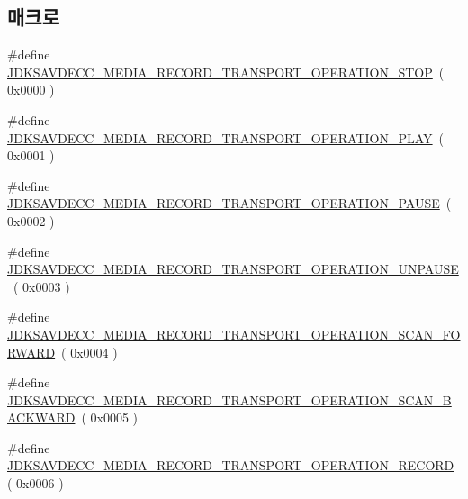 \subsection*{매크로}
\begin{DoxyCompactItemize}
\item 
\#define \hyperlink{group__media__record__transport__operation_ga816ace61621d154aa7f01a2a7f62cb23}{J\+D\+K\+S\+A\+V\+D\+E\+C\+C\+\_\+\+M\+E\+D\+I\+A\+\_\+\+R\+E\+C\+O\+R\+D\+\_\+\+T\+R\+A\+N\+S\+P\+O\+R\+T\+\_\+\+O\+P\+E\+R\+A\+T\+I\+O\+N\+\_\+\+S\+T\+OP}~( 0x0000 )
\item 
\#define \hyperlink{group__media__record__transport__operation_ga28f803d66f4e81eb4666a5a24b9708a4}{J\+D\+K\+S\+A\+V\+D\+E\+C\+C\+\_\+\+M\+E\+D\+I\+A\+\_\+\+R\+E\+C\+O\+R\+D\+\_\+\+T\+R\+A\+N\+S\+P\+O\+R\+T\+\_\+\+O\+P\+E\+R\+A\+T\+I\+O\+N\+\_\+\+P\+L\+AY}~( 0x0001 )
\item 
\#define \hyperlink{group__media__record__transport__operation_ga2d954b7946568252bf65d56d92bd7aec}{J\+D\+K\+S\+A\+V\+D\+E\+C\+C\+\_\+\+M\+E\+D\+I\+A\+\_\+\+R\+E\+C\+O\+R\+D\+\_\+\+T\+R\+A\+N\+S\+P\+O\+R\+T\+\_\+\+O\+P\+E\+R\+A\+T\+I\+O\+N\+\_\+\+P\+A\+U\+SE}~( 0x0002 )
\item 
\#define \hyperlink{group__media__record__transport__operation_ga5ce65b2eec525136ecdba4d766371b5e}{J\+D\+K\+S\+A\+V\+D\+E\+C\+C\+\_\+\+M\+E\+D\+I\+A\+\_\+\+R\+E\+C\+O\+R\+D\+\_\+\+T\+R\+A\+N\+S\+P\+O\+R\+T\+\_\+\+O\+P\+E\+R\+A\+T\+I\+O\+N\+\_\+\+U\+N\+P\+A\+U\+SE}~( 0x0003 )
\item 
\#define \hyperlink{group__media__record__transport__operation_gac1908031b1369009b8a76192fbcad065}{J\+D\+K\+S\+A\+V\+D\+E\+C\+C\+\_\+\+M\+E\+D\+I\+A\+\_\+\+R\+E\+C\+O\+R\+D\+\_\+\+T\+R\+A\+N\+S\+P\+O\+R\+T\+\_\+\+O\+P\+E\+R\+A\+T\+I\+O\+N\+\_\+\+S\+C\+A\+N\+\_\+\+F\+O\+R\+W\+A\+RD}~( 0x0004 )
\item 
\#define \hyperlink{group__media__record__transport__operation_ga8a906ec743b2f8add810578ae250af84}{J\+D\+K\+S\+A\+V\+D\+E\+C\+C\+\_\+\+M\+E\+D\+I\+A\+\_\+\+R\+E\+C\+O\+R\+D\+\_\+\+T\+R\+A\+N\+S\+P\+O\+R\+T\+\_\+\+O\+P\+E\+R\+A\+T\+I\+O\+N\+\_\+\+S\+C\+A\+N\+\_\+\+B\+A\+C\+K\+W\+A\+RD}~( 0x0005 )
\item 
\#define \hyperlink{group__media__record__transport__operation_gaf19cfe0a934ebb99416fce74242cde4e}{J\+D\+K\+S\+A\+V\+D\+E\+C\+C\+\_\+\+M\+E\+D\+I\+A\+\_\+\+R\+E\+C\+O\+R\+D\+\_\+\+T\+R\+A\+N\+S\+P\+O\+R\+T\+\_\+\+O\+P\+E\+R\+A\+T\+I\+O\+N\+\_\+\+R\+E\+C\+O\+RD}~( 0x0006 )
\end{DoxyCompactItemize}


